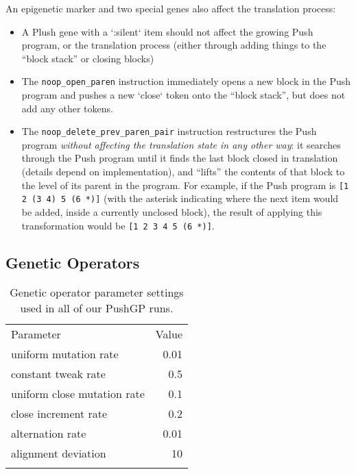 An epigenetic marker and two special genes also affect the translation process:

\begin{itemize}
\item
A Plush gene with a `:silent` item should not affect the growing Push program, or the translation process (either through adding things to the ``block stack'' or closing blocks)

\item
The  \texttt{noop\_open\_paren} instruction immediately opens a new block in the Push program and pushes a new `close` token onto the ``block stack'', but does not add any other tokens.

\item
The  \texttt{noop\_delete\_prev\_paren\_pair}  instruction restructures the Push program \textit{without affecting the translation state in any other way}: it searches through the Push program until it finds the last block closed in translation (details depend on implementation), and ``lifts'' the contents of that block to the level of its parent in the program. For example, if the Push program is \texttt{[1 2 (3 4) 5 (6 *)]} (with the asterisk indicating where the next item would be added, inside a currently unclosed block), the result of applying this transformation would be \texttt{[1 2 3 4 5 (6 *)]}.

\end{itemize}

\subsection{Genetic Operators}
\label{section:genetic-operators}

\begin{table}[t]
\centering
\caption{Genetic operator parameter settings used in all of our PushGP runs.}
\label{tableGPconstantParams}
\begin{tabular}{l r}
\hline\noalign{\smallskip}
Parameter & Value \tabularnewline
\noalign{\smallskip}\svhline\noalign{\smallskip}
uniform mutation rate & 0.01 \tabularnewline
constant tweak rate & 0.5 \\
uniform close mutation rate & 0.1 \tabularnewline
close increment rate & 0.2 \\
alternation rate & 0.01 \tabularnewline
alignment deviation & 10 \tabularnewline
\noalign{\smallskip}\hline\noalign{\smallskip}
\end{tabular}
\end{table}

